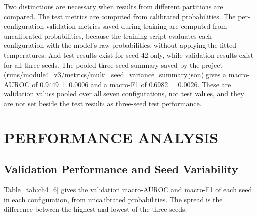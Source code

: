 Two distinctions are necessary when results from different partitions are compared. The test metrics are computed from calibrated probabilities. The per-configuration validation metrics saved during training are computed from uncalibrated probabilities, because the training script evaluates each configuration with the model's raw probabilities, without applying the fitted temperatures. And test results exist for seed 42 only, while validation results exist for all three seeds. The pooled three-seed summary saved by the project (\url{runs/module4_v3/metrics/multi_seed_variance_summary.json}) gives a macro-AUROC of 0.9449 ± 0.0006 and a macro-F1 of 0.6982 ± 0.0026. These are validation values pooled over all seven configurations, not test values, and they are not set beside the test results as three-seed test performance.

\section{PERFORMANCE ANALYSIS}\label{sec:ch4_4}

\subsection{Validation Performance and Seed Variability}\label{sec:ch4_4_1}

Table~\ref{tab:ch4_6} gives the validation macro-AUROC and macro-F1 of each seed in each configuration, from uncalibrated probabilities. The spread is the difference between the highest and lowest of the three seeds.

